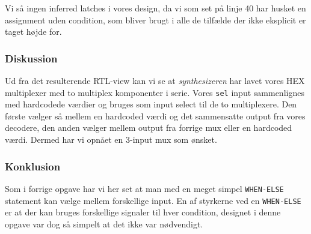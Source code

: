{  Vi så ingen inferred latches i vores design, da vi som set på  linje 40 har husket en assignment uden condition, som bliver brugt i alle de tilfælde der ikke eksplicit er taget højde for.


  \subsubsection{Diskussion}
  
  Ud fra det resulterende RTL-view kan vi se at \textit{synthesizeren} har lavet vores HEX multiplexer med to multiplex komponenter i serie.
  Vores \texttt{sel} input sammenlignes med hardcodede værdier og bruges som input select til de to multiplexere. Den første vælger så mellem en hardcoded værdi og det sammensatte output fra vores decodere, den anden vælger mellem output fra forrige mux eller en hardcoded værdi. Dermed har vi opnået en 3-input mux som ønsket.

  \subsubsection{Konklusion}

  Som i forrige opgave har vi her set at man med en meget simpel \texttt{WHEN-ELSE} statement kan vælge mellem forskellige input. En af styrkerne ved en \texttt{WHEN-ELSE} er at der kan bruges forskellige signaler til hver condition, designet i denne opgave var dog så simpelt at det ikke var nødvendigt.

}